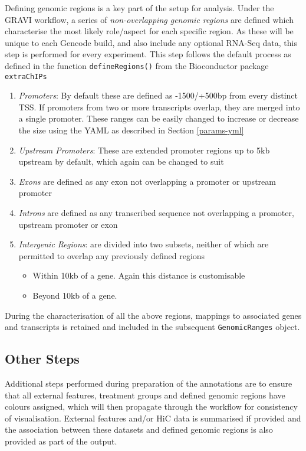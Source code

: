 \documentclass[
]{book}
\providecommand{\tightlist}{%
  \setlength{\itemsep}{0pt}\setlength{\parskip}{0pt}}
\begin{document}
Defining genomic regions is a key part of the setup for analysis.
Under the GRAVI workflow, a series of \emph{non-overlapping genomic regions} are defined which characterise the most likely role/aspect for each specific region.
As these will be unique to each Gencode build, and also include any optional RNA-Seq data, this step is performed for every experiment.
This step follows the default process as defined in the function \texttt{defineRegions()} from the Bioconductor package \texttt{extraChIPs}

\begin{enumerate}
\def\labelenumi{\arabic{enumi}.}
\tightlist
\item
  \emph{Promoters}: By default these are defined as -1500/+500bp from every distinct TSS.
  If promoters from two or more transcripts overlap, they are merged into a single promoter.
  These ranges can be easily changed to increase or decrease the size using the YAML as described in Section \ref{params-yml}
\item
  \emph{Upstream Promoters}: These are extended promoter regions up to 5kb upstream by default, which again can be changed to suit
\item
  \emph{Exons} are defined as any exon not overlapping a promoter or upstream promoter
\item
  \emph{Introns} are defined as any transcribed sequence not overlapping a promoter, upstream promoter or exon
\item
  \emph{Intergenic Regions}: are divided into two subsets, neither of which are permitted to overlap any previously defined regions

  \begin{itemize}
  \tightlist
  \item
    Within 10kb of a gene. Again this distance is customisable
  \item
    Beyond 10kb of a gene.
  \end{itemize}
\end{enumerate}

During the characterisation of all the above regions, mappings to associated genes and transcripts is retained and included in the subsequent \texttt{GenomicRanges} object.

\hypertarget{other-steps}{%
\subsection*{Other Steps}\label{other-steps}}

Additional steps performed during preparation of the annotations are to ensure that all external features, treatment groups and defined genomic regions have colours assigned, which will then propagate through the workflow for consistency of visualisation.
External features and/or HiC data is summarised if provided and the association between these datasets and defined genomic regions is also provided as part of the output.
\end{document}
